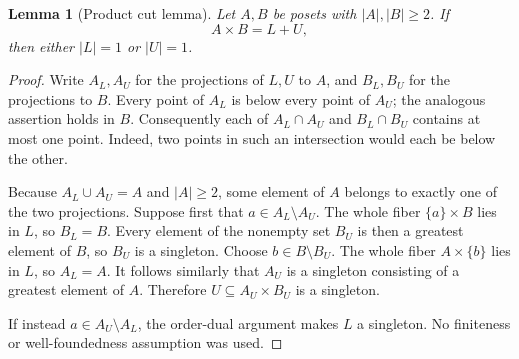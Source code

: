 \documentclass[11pt,letterpaper]{article}
\newtheorem{lemma}[theorem]{Lemma}
\theoremstyle{definition}
\theoremstyle{remark}
\begin{document}
\begin{lemma}[Product cut lemma]\label{lem:cut}
Let $A,B$ be posets with $|A|,|B|\ge2$. If
\[
 A\times B=L+U,
\]
then either $|L|=1$ or $|U|=1$.
\end{lemma}
\begin{proof}
Write $A_L,A_U$ for the projections of $L,U$ to $A$, and $B_L,B_U$ for
the projections to $B$. Every point of $A_L$ is below every point of
$A_U$; the analogous assertion holds in $B$. Consequently each of
$A_L\cap A_U$ and $B_L\cap B_U$ contains at most one point. Indeed, two
points in such an intersection would each be below the other.

Because $A_L\cup A_U=A$ and $|A|\ge2$, some element of $A$ belongs to
exactly one of the two projections. Suppose first that
$a\in A_L\setminus A_U$. The whole fiber $\{a\}\times B$ lies in $L$,
so $B_L=B$. Every element of the nonempty set $B_U$ is then a greatest
element of $B$, so $B_U$ is a singleton. Choose
$b\in B\setminus B_U$. The whole fiber $A\times\{b\}$ lies in $L$,
so $A_L=A$. It follows similarly that $A_U$ is a singleton consisting of
a greatest element of $A$. Therefore $U\subseteq A_U\times B_U$ is a
singleton.

If instead $a\in A_U\setminus A_L$, the order-dual argument makes $L$
a singleton. No finiteness or well-foundedness assumption was used.
\end{proof}
\end{document}
